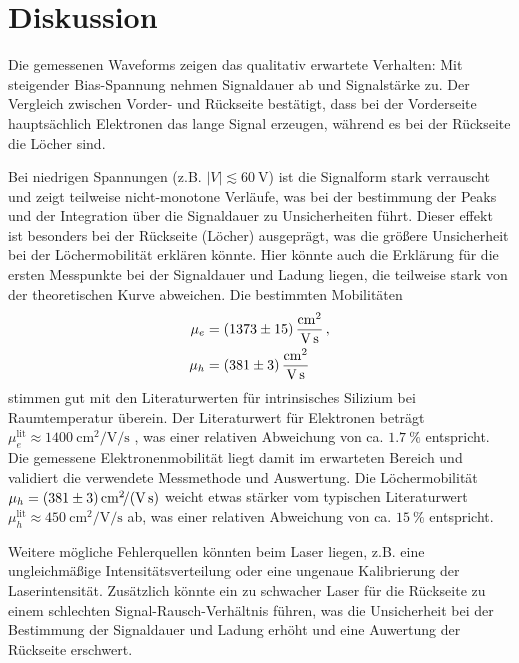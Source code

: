 \section{Diskussion}
\label{sec:Discussion}
Die gemessenen Waveforms zeigen das qualitativ erwartete Verhalten: 
Mit steigender Bias-Spannung nehmen Signaldauer ab und Signalstärke zu. 
Der Vergleich zwischen Vorder- und Rückseite bestätigt, dass bei der Vorderseite hauptsächlich Elektronen das lange Signal erzeugen, 
während es bei der Rückseite die Löcher sind.

Bei niedrigen Spannungen (z.B. $|V| \lesssim \SI{60}{\volt}$) ist die Signalform stark verrauscht und zeigt teilweise nicht-monotone Verläufe,
was bei der bestimmung der Peaks und der Integration über die Signaldauer zu Unsicherheiten führt.
Dieser effekt ist besonders bei der Rückseite (Löcher) ausgeprägt, was die größere Unsicherheit bei der Löchermobilität erklären könnte.
Hier könnte auch die Erklärung für die ersten Messpunkte bei der Signaldauer und Ladung liegen, 
die teilweise stark von der theoretischen Kurve abweichen. 
Die bestimmten Mobilitäten
\begin{align*}
  \mu_e &= \SI{1373 \pm 15}{\centi\meter\squared\per\volt\per\second}\,, \\
  \mu_h &= \SI{381 \pm 3}{\centi\meter\squared\per\volt\per\second}
\end{align*}
stimmen gut mit den Literaturwerten für intrinsisches Silizium bei Raumtemperatur überein. 
Der Literaturwert für Elektronen beträgt $\mu_e^\text{lit} \approx \SI{1400}{\centi\meter\squared\per\volt\per\second}$ \cite{Wermes}, 
was einer relativen Abweichung von ca. $\SI{1.7}{\percent}$ entspricht. 
Die gemessene Elektronenmobilität liegt damit im erwarteten Bereich und validiert die verwendete Messmethode und Auswertung.
Die Löchermobilität $\mu_h = \SI{381 \pm 3}{\centi\meter\squared\per\volt\per\second}$ weicht etwas stärker vom typischen Literaturwert $\mu_h^\text{lit} \approx \SI{450}{\centi\meter\squared\per\volt\per\second}$ ab, 
was einer relativen Abweichung von ca. $\SI{15}{\percent}$ entspricht. 

Weitere mögliche Fehlerquellen könnten beim Laser liegen, z.B. eine ungleichmäßige Intensitätsverteilung oder eine ungenaue Kalibrierung der Laserintensität.
Zusätzlich könnte ein zu schwacher Laser für die Rückseite zu einem schlechten Signal-Rausch-Verhältnis führen, 
was die Unsicherheit bei der Bestimmung der Signaldauer und Ladung erhöht und eine Auwertung der Rückseite erschwert.